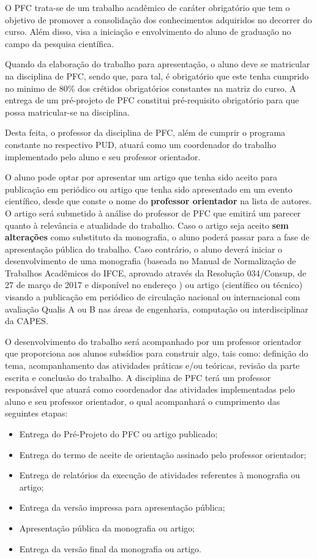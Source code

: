 O PFC trata-se de um trabalho acadêmico de caráter obrigatório que tem o objetivo de promover a consolidação dos conhecimentos adquiridos no decorrer do curso. Além disso, visa a iniciação e envolvimento do aluno de graduação no campo da pesquisa científica.

Quando da elaboração do trabalho para apresentação, o aluno deve se matricular na disciplina de PFC, sendo que, para tal, é obrigatório que este tenha cumprido no minimo de 80\% dos crétidos obrigatórios constantes na matriz do curso.  
A entrega de um pré-projeto de PFC constitui pré-requisito obrigatório para que possa matricular-se na disciplina. 

Desta feita, o professor da disciplina de PFC, além de cumprir o programa constante no respectivo PUD, atuará como um coordenador do trabalho implementado pelo aluno e seu professor orientador.

O aluno pode optar por apresentar um artigo que tenha sido aceito para publicação em periódico ou artigo que tenha sido apresentado em um evento científico, desde que conste o nome do \textbf{professor orientador} na lista de autores. O artigo será submetido à análise do professor de PFC que emitirá um parecer quanto à relevância e atualidade do trabalho. Caso o artigo seja aceito \textbf{sem alterações} como substituto da monografia, o aluno poderá passar para a fase de apresentação pública do trabalho. Caso contrário, o aluno deverá iniciar o desenvolvimento de uma monografia (baseada no Manual de Normalização de Trabalhos Acadêmicos do IFCE, aprovado através da Resolução 034/Consup, de 27 de março de 2017 e disponível no endereço ) ou artigo (científico ou técnico) visando a publicação em periódico de circulação nacional ou internacional com avaliação Qualis A ou B nas áreas de engenharia, computação ou interdisciplinar da CAPES.

O desenvolvimento do trabalho será acompanhado por um professor orientador que proporciona aos alunos subsídios para construir algo, tais como: definição do tema, acompanhamento das atividades práticas e/ou teóricas, revisão da parte escrita e conclusão do trabalho. A disciplina de PFC terá um professor responsável que atuará como coordenador das atividades implementadas pelo aluno e seu professor orientador, o qual acompanhará o cumprimento das seguintes etapas:

\begin{itemize}
	\item Entrega do Pré-Projeto do PFC ou artigo publicado;
	\item Entrega do termo de aceite de orientação assinado pelo professor orientador;
	\item Entrega de relatórios da execução de atividades referentes à monografia ou artigo;
	\item Entrega da versão impressa para apresentação pública;
	\item Apresentação pública da monografia ou artigo;
	\item Entrega da versão final da monografia ou artigo.
\end{itemize}

